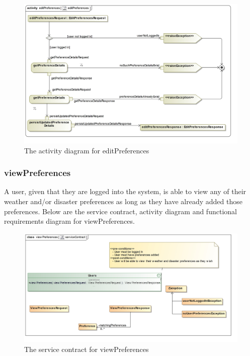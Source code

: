 \begin{figure}[H]
	\centering
	\includegraphics[scale=0.21]{../images/funcReq/editPreferencesActivityDiagram.jpg}
	\caption{The activity diagram for editPreferences \label{overflow}}
\end{figure}

\subsubsection{viewPreferences}

A user, given that they are logged into the system, is able to view any of their weather and/or disaster preferences as long as they have already added those preferences. Below are the service contract, activity diagram and functional requirements diagram for viewPreferences.

\begin{figure}[H]
	\centering
	\includegraphics[scale=0.2]{../images/funcReq/viewPreferencesServiceContract.jpg}
	\caption{The service contract for viewPreferences \label{overflow}}
\end{figure}

